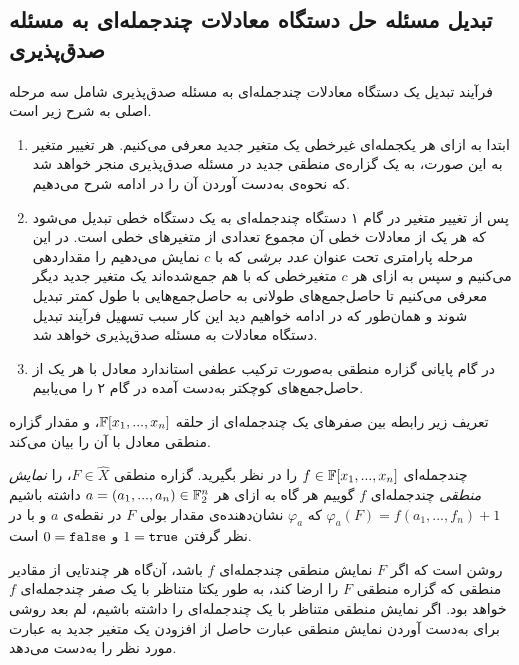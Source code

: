 \subsection{تبدیل مسئله حل دستگاه معادلات چندجمله‌ای به مسئله صدق‌پذیری}
فرآیند تبدیل یک دستگاه معادلات چندجمله‌ای به مسئله‌ صدق‌پذیری شامل سه مرحله اصلی به شرح زیر است.
\begin{enumerate}
\item
ابتدا به ازای هر یکجمله‌ای غیرخطی یک متغیر جدید معرفی می‌کنیم. هر تغییر متغیر به این صورت، به یک گزاره‌ی منطقی جدید در مسئله صدق‌پذیری منجر خواهد شد که نحوه‌ی به‌دست آوردن آن را در ادامه شرح می‌دهیم. 
\item
پس از تغییر متغیر در گام ۱ دستگاه چندجمله‌ای به یک دستگاه خطی تبدیل می‌شود که هر یک از معادلات خطی آن مجموع تعدادی از متغیرهای خطی است. در این مرحله پارامتری تحت عنوان 
\textit{عدد برشی}
که با 
$c$
نمایش می‌دهیم را مقداردهی می‌کنیم و سپس به ازای هر 
$c$
متغیرخطی که با هم جمع‌شده‌اند یک متغیر جدید دیگر معرفی می‌کنیم تا حاصل‌جمع‌های طولانی به حاصل‌جمع‌هایی با طول کمتر تبدیل شوند و همان‌طور ‌که در ادامه خواهیم دید این کار سبب تسهیل فرآیند تبدیل دستگاه معادلات به مسئله‌ صدق‌پذیری خواهد شد. 
\item
در گام پایانی گزاره منطقی  به‌صورت ترکیب عطفی استاندارد معادل با هر یک از حاصل‌جمع‌های کوچکتر به‌دست آمده  در گام ۲ را می‌یابیم. 

\end{enumerate}
تعریف زیر رابطه‌ بین صفرهای یک چندجمله‌ای  از حلقه 
$\mathbb{F}[x_{1},...,x_{n}]$،  
و مقدار گزاره‌ منطقی معادل با آن را بیان می‌کند. 
\begin{definition}
چندجمله‌ای 
$f\in\mathbb{F}[x_{1},...,x_{n}]$
را در نظر بگیرید. گزاره منطقی 
$F\in \widehat{X}$، 
را 
\textit{نمایش منطقی}
چندجمله‌ای 
$f$
گوییم هر گاه به ازای هر 
$a = (a_{1},...,a_{n})\in\mathbb{F}_{2}^{n}$
داشته باشیم 
$\varphi_{a}(F) = f(a_{1},...,f_{n}) + 1$
که 
$\varphi_{a}$
نشان‌دهنده‌ی مقدار بولی 
$F$
در نقطه‌ی 
$a$
و با در نظر گرفتن 
$1 = \verb|true|$
و 
$0 = \verb|false|$
است. 
\end{definition}
روشن است که اگر 
$F$
نمایش منطقی چندجمله‌ای 
$f$
باشد، آن‌‌گاه هر چندتایی از مقادیر منطقی که گزاره‌ منطقی 
$F$
را ارضا کند، به طور یکتا متناظر با یک صفر چندجمله‌ای 
$f$
خواهد بود. اگر نمایش منطقی متناظر با یک چندجمله‌ای را داشته باشیم، لم بعد روشی برای به‌دست آوردن نمایش منطقی عبارت حاصل از افزودن یک متغیر جدید به عبارت مورد نظر را به‌دست می‌دهد. 

